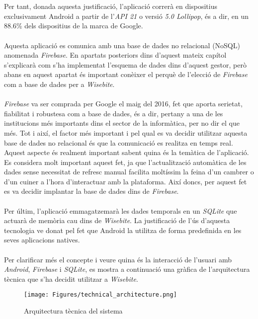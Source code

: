 \\\\
Per tant, donada aquesta justificació, l'aplicació correrà en dispositius exclusivament Android a partir de l'\textit{API 21} o versió \textit{5.0 Lollipop}, és a dir, en un 88.6\%\cite{androidOsAnalytics} dels dispositius de la marca de Google.
\\\\
Aquesta aplicació es comunica amb una base de dades no relacional (NoSQL) anomenada \textit{Firebase}. En apartats posteriors dins d'aquest mateix capítol s'explicarà com s'ha implementat l'esquema de dades dins d'aquest gestor, però abans en aquest apartat és important conèixer el perquè de l'elecció de \textit{Firebase} com a base de dades per a \textit{Wisebite}.
\\\\
\textit{Firebase} va ser comprada per Google el maig del 2016, fet que aporta serietat, fiabilitat i robustesa com a base de dades, és a dir, pertany a una de les institucions més importants dins el sector de la informàtica, per no dir el que més. Tot i així, el factor més important i pel qual es va decidir utilitzar aquesta base de dades no relacional és que la comunicació es realitza en temps real. Aquest aspecte és realment important sabent quina és la temàtica de l'aplicació. Es considera molt important aquest fet, ja que l'actualització automàtica de les dades sense necessitat de refresc manual facilita moltíssim la feina d'un cambrer o d'un cuiner a l'hora d'interactuar amb la plataforma. Així doncs, per aquest fet es va decidir implantar la base de dades dins de \textit{Firebase}.
\\\\
Per últim, l'aplicació emmagatzemarà les dades temporals en un \textit{SQLite} que actuarà de memòria cau dins de \textit{Wisebite}. La justificació de l'ús d'aquesta tecnologia ve donat pel fet que Android la utilitza de forma predefinida en les seves aplicacions natives.
\\\\
Per clarificar més el concepte i veure quina és la interacció de l'usuari amb \textit{Android}, \textit{Firebase} i \textit{SQLite}, es mostra a continuació una gràfica de l'arquitectura tècnica que s'ha decidit utilitzar a \textit{Wisebite}.
\begin{figure}[H]
\centering
\texttt{[image: Figures/technical\_architecture.png]}
\caption{Arquitectura tècnica del sistema}
\end{figure}

